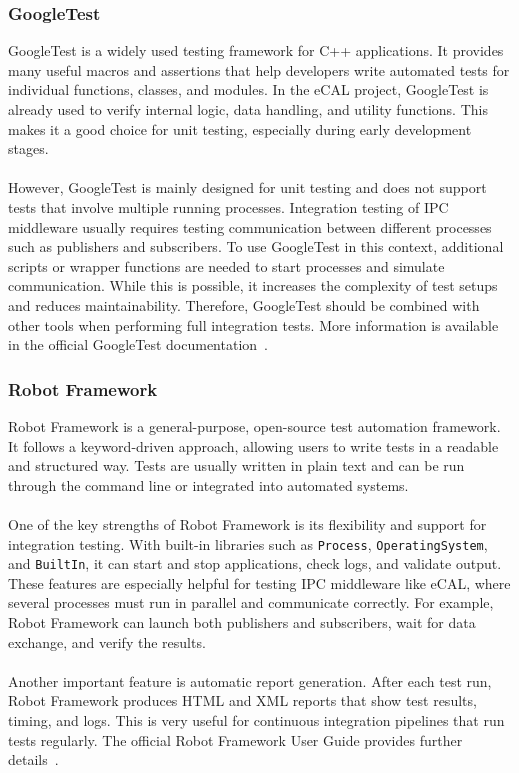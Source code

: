 \subsubsection*{GoogleTest}

GoogleTest is a widely used testing framework for C++ applications. It provides many useful macros and assertions that help developers write automated tests for individual functions, classes, and modules. In the eCAL project, GoogleTest is already used to verify internal logic, data handling, and utility functions. This makes it a good choice for unit testing, especially during early development stages.
\\
\\
However, GoogleTest is mainly designed for unit testing and does not support tests that involve multiple running processes. Integration testing of IPC middleware usually requires testing communication between different processes such as publishers and subscribers. To use GoogleTest in this context, additional scripts or wrapper functions are needed to start processes and simulate communication. While this is possible, it increases the complexity of test setups and reduces maintainability. Therefore, GoogleTest should be combined with other tools when performing full integration tests. More information is available in the official GoogleTest documentation~\cite{GoogleTestDocs}.

\subsubsection*{Robot Framework}

Robot Framework is a general-purpose, open-source test automation framework. It follows a keyword-driven approach, allowing users to write tests in a readable and structured way. Tests are usually written in plain text and can be run through the command line or integrated into automated systems.
\\
\\
One of the key strengths of Robot Framework is its flexibility and support for integration testing. With built-in libraries such as \texttt{Process}, \texttt{OperatingSystem}, and \texttt{BuiltIn}, it can start and stop applications, check logs, and validate output. These features are especially helpful for testing IPC middleware like eCAL, where several processes must run in parallel and communicate correctly. For example, Robot Framework can launch both publishers and subscribers, wait for data exchange, and verify the results.
\\
\\
Another important feature is automatic report generation. After each test run, Robot Framework produces HTML and XML reports that show test results, timing, and logs. This is very useful for continuous integration pipelines that run tests regularly. The official Robot Framework User Guide provides further details~\cite{RobotFrameworkDocs}.

